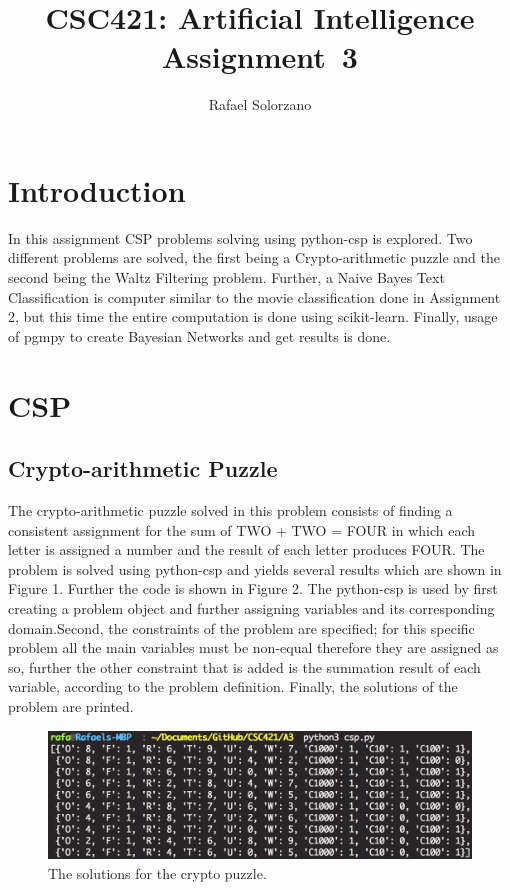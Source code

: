 \documentclass[12pt, letter]{article}
\newcommand{\courseName}{CSC421: Artificial Intelligence}
\newcommand{\assignName}{Assignment~3}
\begin{document}
\pagestyle{titlesec_assignment}

\title{\courseName\\\assignName}
\author{Rafael Solorzano}
\maketitle

\section{Introduction}

In this assignment CSP problems solving using python-csp is explored. Two different problems are solved, the first being a Crypto-arithmetic puzzle and the second being the Waltz Filtering problem. Further, a Naive Bayes Text Classification is computer similar to the movie classification done in Assignment 2, but this time the entire computation is done using scikit-learn. Finally, usage of pgmpy to create Bayesian Networks and get results is done.  

\section{CSP}

\subsection{Crypto-arithmetic Puzzle}

The crypto-arithmetic puzzle solved in this problem consists of finding a consistent assignment for the sum of TWO + TWO = FOUR in which each letter is assigned a number and the result of each letter produces FOUR. The problem is solved using python-csp and yields several results which are shown in Figure 1. Further the code is shown in Figure 2. The python-csp is used by first creating a problem object and further assigning variables and its corresponding domain.Second, the constraints of the problem are specified; for this specific problem all the main variables must be non-equal therefore they are assigned as so, further the other constraint that is added is the summation result of each variable, according to the problem definition. Finally, the solutions of the problem are printed. 

 \begin{figure}[htb]
  \centering
  \includegraphics[width=0.75 \textwidth]{./figures/csp_results.png}
  \caption{The solutions for the crypto puzzle.}
\end{figure}
\end{document}
